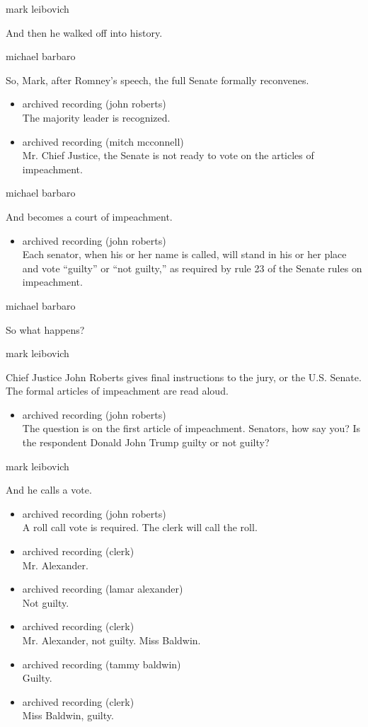 mark leibovich

And then he walked off into history.

michael barbaro

So, Mark, after Romney's speech, the full Senate formally reconvenes.

\begin{itemize}
\item
  archived recording (john roberts)\\
  The majority leader is recognized.
\item
  archived recording (mitch mcconnell)\\
  Mr. Chief Justice, the Senate is not ready to vote on the articles of
  impeachment.
\end{itemize}

michael barbaro

And becomes a court of impeachment.

\begin{itemize}
\tightlist
\item
  archived recording (john roberts)\\
  Each senator, when his or her name is called, will stand in his or her
  place and vote ``guilty'' or ``not guilty,'' as required by rule 23 of
  the Senate rules on impeachment.
\end{itemize}

michael barbaro

So what happens?

mark leibovich

Chief Justice John Roberts gives final instructions to the jury, or the
U.S. Senate. The formal articles of impeachment are read aloud.

\begin{itemize}
\tightlist
\item
  archived recording (john roberts)\\
  The question is on the first article of impeachment. Senators, how say
  you? Is the respondent Donald John Trump guilty or not guilty?
\end{itemize}

mark leibovich

And he calls a vote.

\begin{itemize}
\item
  archived recording (john roberts)\\
  A roll call vote is required. The clerk will call the roll.
\item
  archived recording (clerk)\\
  Mr. Alexander.
\item
  archived recording (lamar alexander)\\
  Not guilty.
\item
  archived recording (clerk)\\
  Mr. Alexander, not guilty. Miss Baldwin.
\item
  archived recording (tammy baldwin)\\
  Guilty.
\item
  archived recording (clerk)\\
  Miss Baldwin, guilty.
\end{itemize}


